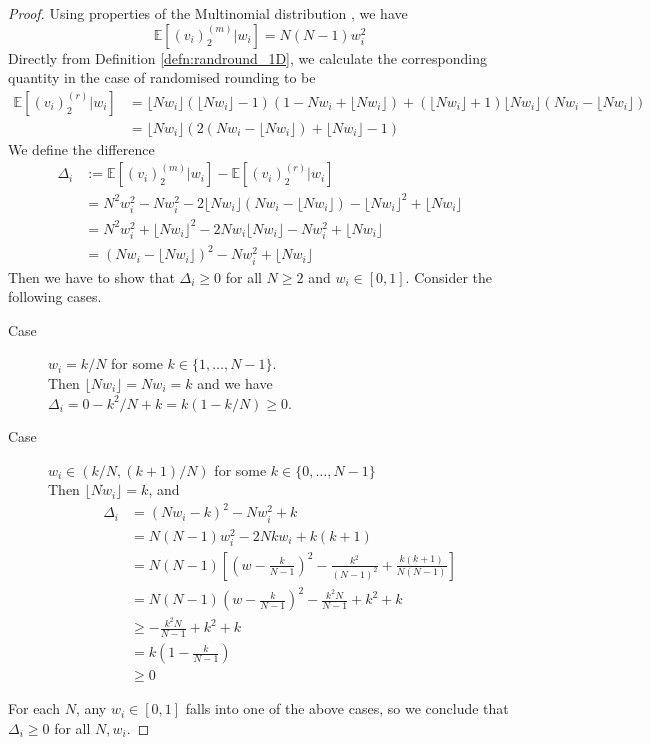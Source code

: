 \documentclass[fleqn]{article}
\theoremstyle{definition}
\newcommand{\E}{\mathbb{E}}
\newcommand{\flnw}{\lfloor Nw_i \rfloor }
\begin{document}
\begin{proof}
Using properties of the Multinomial distribution \citep{mosimann1962}, we have
\begin{equation*}
\E[(v_i)_2^{(m)} | w_i]  = N(N-1)w_i^2
\end{equation*}
Directly from Definition \ref{defn:randround_1D}, we calculate the corresponding quantity in the case of randomised rounding to be
\begin{align*}
\E[(v_i)_2^{(r)} | w_i] &= \flnw (\flnw -1) (1 - Nw_i + \flnw) + (\flnw +1) \flnw (Nw_i - \flnw) \\
&= \flnw \left( 2(Nw_i - \flnw) + \flnw -1 \right)
\end{align*}
We define the difference 
\begin{align*}
\Delta_i &:= \E[(v_i)_2^{(m)} | w_i] - \E[(v_i)_2^{(r)} | w_i] \\
&= N^2w_i^2 - Nw_i^2 - 2\flnw(Nw_i - \flnw) - \flnw^2 + \flnw \\
&= N^2 w_i^2 + \flnw^2 -2Nw_i \flnw - Nw_i^2 + \flnw \\
&= (Nw_i - \flnw)^2 - Nw_i^2 + \flnw 
\end{align*}
Then we have to show that $\Delta_i \geq 0$ for all $N\geq 2$ and $w_i \in [0,1]$. Consider the following cases.
\begin{description}
\item[Case] $w_i=k/N$ for some $k \in \{1, \dots, N-1\}$. \\
Then $\flnw = Nw_i = k$ and we have\\
$\Delta_i = 0 - k^2/N + k = k(1- k/N) \geq 0$.
\item[Case] $w_i \in (k/N, (k+1)/N )$ for some $k \in \{0, \dots, N-1\}$ \\
Then $\flnw = k$, and
\begin{align*}
\Delta_i &= (Nw_i - k)^2 - Nw_i^2 + k\\
&= N(N-1)w_i^2 - 2Nkw_i + k(k+1) \\
&= N(N-1) \left[ \left( w-\frac{k}{N-1} \right)^2 - \frac{k^2}{(N-1)^2} + \frac{k(k+1)}{N(N-1)} \right]\\
&= N(N-1) \left( w-\frac{k}{N-1} \right)^2 - \frac{k^2 N}{N-1} + k^2 +k \\
&\geq - \frac{k^2 N}{N-1} + k^2 +k \\
&= k\left(1-\frac{k}{N-1}\right)\\
&\geq 0
\end{align*}
\end{description}
For each $N$, any $w_i \in [0,1]$ falls into one of the above cases, so we conclude that $\Delta_i \geq 0$ for all $N, w_i$.
\end{proof}
\end{document}
